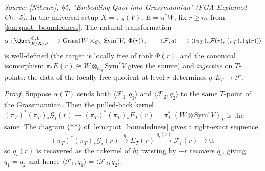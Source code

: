 \begin{lemma}
  \label{lem:quot_alpha_injective}

  \textit{Source: [Nitsure], \S 5, "Embedding Quot into Grassmannian"
  (FGA Explained Ch.~5).}
  In the universal setup \(X = \mathbb{P}_S(V)\), \(E = \pi^* W\), fix
  \(r \ge m\) from \cref{lem:quot_boundedness}. The natural transformation
  \[
    \alpha :
    \Quot^{\Phi,L}_{E/X/S} \longrightarrow
    \mathrm{Grass}\!\left(
      W \otimes_{\mathcal{O}_S} \mathrm{Sym}^r V,\; \Phi(r)
    \right),
    \qquad
    \langle \mathcal{F}, q\rangle \longmapsto
    \langle (\pi_T)_*\mathcal{F}(r),\, (\pi_T)_*(q(r))\rangle
  \]
  is well-defined (the target is locally free of rank \(\Phi(r)\), and the
  canonical isomorphism \(\pi_* E(r) \cong W \otimes_{\mathcal{O}_S}
  \mathrm{Sym}^r V\) gives the source) and \emph{injective} on \(T\)-points:
  the data of the locally free quotient at level \(r\) determines
  \(q : E_T \to \mathcal{F}\).
\end{lemma}

\begin{proof}
  
  Suppose \(\alpha(T)\) sends both \(\langle \mathcal{F}_1, q_1\rangle\) and
  \(\langle \mathcal{F}_2, q_2\rangle\) to the same \(T\)-point of the
  Grassmannian. Then the pulled-back kernel
  \((\pi_T)^* (\pi_T)_* \mathcal{G}_i(r) \to (\pi_T)^* (\pi_T)_* E_T(r)
  = \pi_{T_0}^* (W \otimes \mathrm{Sym}^r V)_T\)
  is the same. The diagram \textbf{(**)} of
  \cref{lem:quot_boundedness} gives a right-exact sequence
  \[
    (\pi_T)^* (\pi_T)_* \mathcal{G}_i(r) \xrightarrow{h}
    E_T(r) \xrightarrow{q_i(r)} \mathcal{F}_i(r) \to 0,
  \]
  so \(q_i(r)\) is recovered as the cokernel of \(h\); twisting by \(-r\)
  recovers \(q_i\), giving \(q_1 = q_2\) and hence
  \(\langle \mathcal{F}_1, q_1\rangle = \langle \mathcal{F}_2, q_2\rangle\).
\end{proof}

